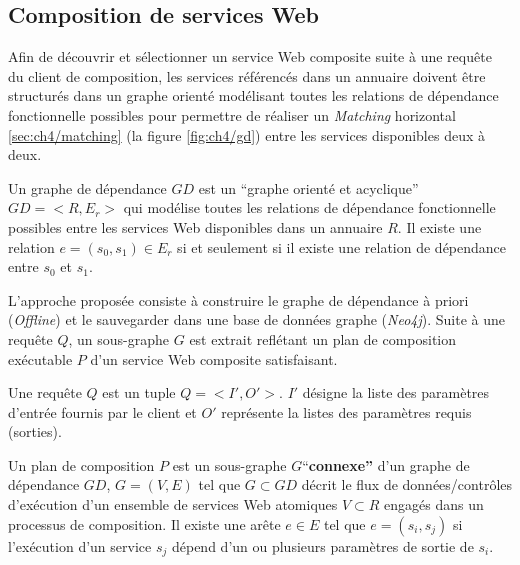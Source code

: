 

\subsection{Composition de services Web}
\label{sec:basic:composition}
Afin de découvrir et sélectionner un service Web composite suite à
une requête du client de composition, les services référencés dans un
annuaire doivent être structurés dans un graphe orienté modélisant
  toutes les relations de dépendance fonctionnelle possibles pour permettre
  de réaliser un \textit{Matching} horizontal \ref{sec:ch4/matching}
  (la figure \ref{fig:ch4/gd}) entre les services disponibles deux à deux.\medskip

  \begin{mydef}
    Un graphe de dépendance $GD$ est un ``graphe orienté et
    acyclique'' $GD=<R, E_r>$ qui modélise toutes les relations de
    dépendance fonctionnelle possibles entre les services Web
    disponibles dans un annuaire $R$. Il existe une relation $e=(s_0,
    s_1) \in E_r$ si et seulement si il existe une relation de
    dépendance entre $s_0$ et $s_1$.
  \end{mydef}

  L'approche proposée consiste à construire le graphe de dépendance à
  priori (\textit{Offline}) et le sauvegarder dans une base de données
  graphe (\textit{Neo4j}). Suite à une requête $Q$, un sous-graphe $G$
  est extrait reflétant un plan de composition exécutable $P$ d'un
  service Web composite satisfaisant.

  \begin{mydef}
    Une requête $Q$ est un tuple $Q = <I', O'>$. $I'$ désigne la liste
    des paramètres d'entrée fournis par le client et $O'$ représente
    la listes des paramètres requis (sorties).
  \end{mydef}

  

  \begin{mydef}
    Un plan de composition $P$ est un sous-graphe
    $G$``\textbf{connexe''} d'un graphe de dépendance $GD$, $G=(V,E)$
    tel que $G \subset GD$ décrit le flux de données/contrôles
    d'exécution d'un ensemble de services Web atomiques $V \subset R$
    engagés dans un processus de composition. Il existe une arête $e
    \in E$ tel que $e = (s_i, s_j)$ si l'exécution d'un service $s_j$
    dépend d'un ou plusieurs paramètres de sortie de $s_i$.
  \end{mydef}

